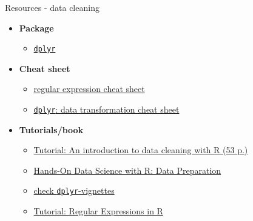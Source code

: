 \documentclass[9pt,ignorenonframetext,]{beamer}
\providecommand{\tightlist}{%
  \setlength{\itemsep}{0pt}\setlength{\parskip}{0pt}}
\begin{document}
\begin{frame}[fragile]{Resources - data cleaning}

\begin{itemize}
\tightlist
\item
  \textbf{Package}

  \begin{itemize}
  \tightlist
  \item
    \href{https://cran.r-project.org/web/packages/dplyr/index.html}{\texttt{dplyr}}
  \end{itemize}
\item
  \textbf{Cheat sheet}

  \begin{itemize}
  \tightlist
  \item
    \href{https://www.rstudio.com/wp-content/uploads/2016/09/RegExCheatsheet.pdf}{regular
    expression cheat sheet}
  \item
    \href{https://github.com/rstudio/cheatsheets/raw/master/data-transformation.pdf}{\texttt{dplyr}:
    data transformation cheat sheet}
  \end{itemize}
\item
  \textbf{Tutorials/book}

  \begin{itemize}
  \tightlist
  \item
    \href{https://cran.r-project.org/doc/contrib/de_Jonge+van_der_Loo-Introduction_to_data_cleaning_with_R.pdf}{Tutorial:
    An introduction to data cleaning with R (53 p.)}
  \item
    \href{https://onepager.togaware.com/DataO.pdf}{Hands-On Data Science
    with R: Data Preparation}
  \item
    \href{https://cran.r-project.org/web/packages/dplyr/index.html}{check
    \texttt{dplyr}-vignettes}
  \item
    \href{https://rstudio-pubs-static.s3.amazonaws.com/74603_76cd14d5983f47408fdf0b323550b846.html}{Tutorial:
    Regular Expressions in R}
  \end{itemize}
\end{itemize}

\end{frame}
\end{document}
